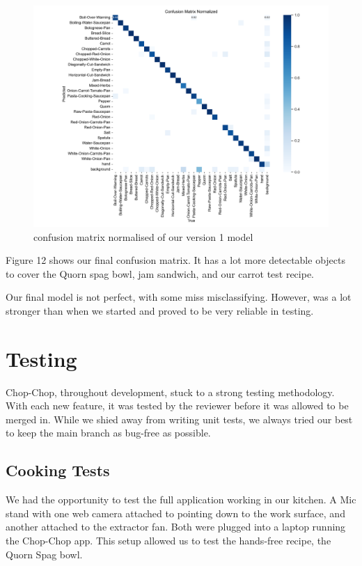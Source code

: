 \documentclass{article}
\begin{document}
\begin{figure}[h!]
    \centering
    \includegraphics[width=1\linewidth]{assets/confusion_matrix_normalized-Version-6.png}
    \caption{confusion matrix normalised of our version 1 model}
    \label{fig:enter-label}
\end{figure}

Figure 12 shows our final confusion matrix. It has a lot more detectable objects to cover the Quorn spag bowl, jam sandwich, and our carrot test recipe.

Our final model is not perfect, with some miss misclassifying. However, was a lot stronger than when we started and proved to be very reliable in testing.


\section{Testing}
Chop-Chop, throughout development, stuck to a strong testing methodology. With each new feature, it was tested by the reviewer before it was allowed to be merged in. While we shied away from writing unit tests, we always tried our best to keep the main branch as bug-free as possible. 

\subsection{Cooking Tests}
We had the opportunity to test the full application working in our kitchen. A Mic stand with one web camera attached to pointing down to the work surface, and another attached to the extractor fan. Both were plugged into a laptop running the Chop-Chop app. This setup allowed us to test the hands-free recipe, the Quorn Spag bowl.
\end{document}
